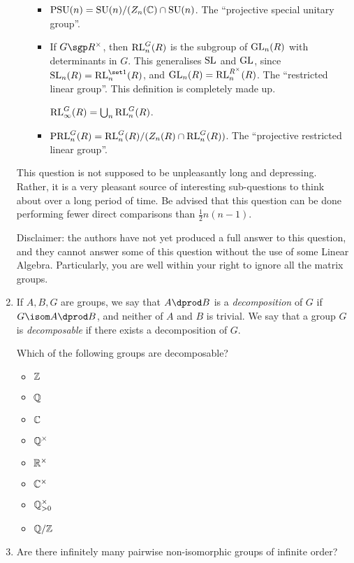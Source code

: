 \documentclass[a4paper,12pt]{article}
\begin{document}
\begin{enumerate}[leftmargin=*]
\begin{itemize}
\begin{itemize}
     \item
      \(\mathrm{PSU}(n) = \mathrm{SU}(n) / (Z_n(\mathbb C) \cap \mathrm{SU}(n)\). The ``projective special
      unitary group''.

     \item
      If \(G \sgp R^\times\), then \(\mathrm{RL}_n^G(R)\) is the subgroup of
      \(\mathrm{GL}_n(R)\) with determinants in \(G\). This generalises \(\mathrm{SL}\) and
      \(\mathrm{GL}\), since \(\SL_n(R) = \RL_n^{\set 1}(R)\), and
      \(\mathrm{GL}_n(R) = \mathrm{RL}_n^{R^\times}(R)\).
      The ``restricted linear group''. This definition is completely made up.

      \(\mathrm{RL}_\infty^G(R) = \bigcup_n \mathrm{RL}_n^G(R)\).
     \item
      \(\mathrm{PRL}_n^G(R) = \mathrm{RL}_n^G(R) / (Z_n(R) \cap \mathrm{RL}_n^G(R))\). The ``projective
      restricted linear group''.

    \end{itemize}
  \end{itemize}
  This question is not supposed to be unpleasantly long and depressing.
  Rather, it is a very pleasant source of interesting sub-questions to think
  about over a long period of time.
  Be advised that this question can be done performing
  fewer direct comparisons than \(\tfrac 12 n(n - 1)\).

  Disclaimer: the authors have not yet produced a full answer to this question,
  and they cannot answer some of this question without the use of some Linear
  Algebra. Particularly, you are well within your right to ignore all the matrix
  groups.
 \item
  If \(A, B, G\) are groups, we say that \(A \dprod B\) is a
  \emph{decomposition} of \(G\) if \(G \isom A \dprod B\), and neither of \(A\)
  and \(B\) is trivial. We say that a group \(G\) is \emph{decomposable} if
  there exists a decomposition of \(G\).

  Which of the following groups are decomposable?
  \begin{multicols}{4}
   \begin{itemize}
    \item
     \(\mathbb Z\)
    \item
     \(\mathbb Q\)
    \item
     \(\mathbb C\)
    \item
     \(\mathbb Q^\times\)
    \item
     \(\mathbb R^\times\)
    \item
     \(\mathbb C^\times\)
    \item
     \(\mathbb Q_{>0}^\times\)
    \item
     \(\mathbb Q / \mathbb Z\)
   \end{itemize}
  \end{multicols}
 \item
  Are there infinitely many pairwise non-isomorphic groups of infinite order?


\end{enumerate}
\end{document}
